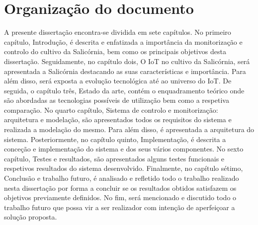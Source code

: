 \section{Organização do documento}


A presente dissertação encontra-se dividida em sete capítulos. No primeiro capítulo, Introdução, é descrita e enfatizada a importância da monitorização e controlo do cultivo da Salicórnia, bem como os principais objetivos desta dissertação. Seguidamente, no capítulo dois, O \ac{IoT} no cultivo da Salicórnia, será apresentada a Salicórnia destacando as suas características e importância. Para além disso, será  
exposta a evolução tecnológica até ao universo do \ac{IoT}. De seguida, o capítulo três, Estado da arte, contém o enquadramento teórico onde são abordadas as tecnologias possíveis de utilização bem como a respetiva comparação. No quarto capítulo, Sistema de controlo e monitorização: arquitetura e modelação, são apresentados todos os requisitos do sistema e realizada a modelação do mesmo. Para além disso, é apresentada a arquitetura do sistema. Posteriormente, no capítulo quinto, Implementação, é descrita a conceção e implementação do sistema e dos seus vários componentes. No sexto capítulo, Testes e resultados, são apresentados alguns testes funcionais e respetivos resultados do sistema desenvolvido. Finalmente, no capítulo sétimo, Conclusão e trabalho futuro, é analisado e refletido todo o trabalho realizado nesta dissertação por forma a concluir se os resultados obtidos satisfazem os objetivos previamente definidos. No fim, será mencionado e discutido todo o trabalho futuro que possa vir a ser realizador com intenção de aperfeiçoar a solução proposta. 



























